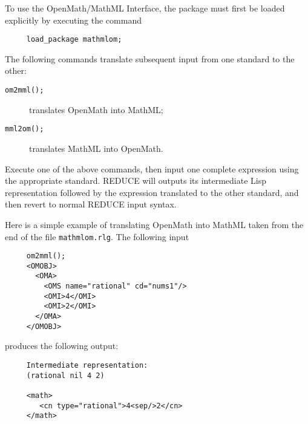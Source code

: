 To use the OpenMath/MathML Interface, the package must first be loaded
explicitly by executing the command
\begin{verbatim}
     load_package mathmlom;
\end{verbatim}


The following commands translate subsequent input from one standard to
the other:
\begin{description}
  \item[\texttt{om2mml();}] translates OpenMath into MathML;
  \item[\texttt{mml2om();}] translates MathML into OpenMath.
\end{description}
Execute one of the above commands, then input one complete expression
using the appropriate standard.  REDUCE will outputs its intermediate
Lisp representation followed by the expression translated to the other
standard, and then revert to normal REDUCE input syntax.

Here is a simple example of translating OpenMath into MathML taken
from the end of the file \texttt{mathmlom.rlg}.  The following input
\begin{verbatim}
     om2mml();
     <OMOBJ>
       <OMA>
         <OMS name="rational" cd="nums1"/>
         <OMI>4</OMI>
         <OMI>2</OMI>
       </OMA>
     </OMOBJ>
\end{verbatim}
produces the following output:
\begin{verbatim}
     Intermediate representation:
     (rational nil 4 2)

     <math>
        <cn type="rational">4<sep/>2</cn>
     </math>
\end{verbatim}
